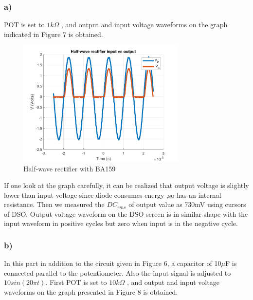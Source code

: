 \documentclass[letterpaper,12pt]{article}
\begin{document}
\subsubsection{a)}

POT is set to \(1k\Omega\) , and output and input voltage waveforms on the graph indicated in Figure 7 is obtained.

\begin{figure}[H]
    \centering
    \includegraphics[width = 0.75\textwidth]{2_a.png}
    \caption{Half-wave rectifier with BA159}
\end{figure} 



If one look at the graph carefully, it can be realized that output voltage is slightly lower than input voltage since diode consumes energy ,so has an internal resistance. Then we measured the \(DC_{rms} \) of output value as 730mV using cursors of DSO. Output voltage waveform on the DSO screen is in similar shape with the input waveform in positive cycles but zero when input is in the negative cycle.  


\subsubsection{b)}
In this part in addition to the circuit given in Figure 6, a capacitor of 10\(\mu\)F is connected parallel to the potentiometer. Also the input signal is adjusted to \(10 sin(20 \pi t) \). First POT is set to \(10k\Omega\) , and output and input voltage waveforms on the graph presented in Figure 8 is obtained.
\end{document}
